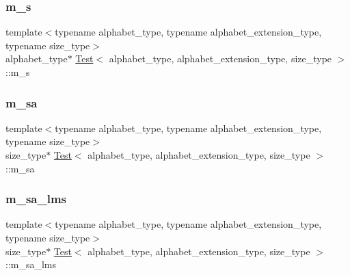 \mbox{\label{class_test_a2992148c8dda566ae4f4ebbdb26bdccd}} 
\subsubsection{\texorpdfstring{m\+\_\+s}{m\_s}}
{\footnotesize\ttfamily template$<$typename alphabet\+\_\+type, typename alphabet\+\_\+extension\+\_\+type, typename size\+\_\+type$>$ \\
alphabet\+\_\+type$\ast$ \hyperlink{class_test}{Test}$<$ alphabet\+\_\+type, alphabet\+\_\+extension\+\_\+type, size\+\_\+type $>$\+::m\+\_\+s\hspace{0.3cm}{\ttfamily [private]}}

\mbox{\label{class_test_a38956729bdb63c0bfe7760e827769309}} 
\subsubsection{\texorpdfstring{m\+\_\+sa}{m\_sa}}
{\footnotesize\ttfamily template$<$typename alphabet\+\_\+type, typename alphabet\+\_\+extension\+\_\+type, typename size\+\_\+type$>$ \\
size\+\_\+type$\ast$ \hyperlink{class_test}{Test}$<$ alphabet\+\_\+type, alphabet\+\_\+extension\+\_\+type, size\+\_\+type $>$\+::m\+\_\+sa\hspace{0.3cm}{\ttfamily [private]}}

\mbox{\label{class_test_a557862839f4ead2e08d12e7770340ded}} 
\subsubsection{\texorpdfstring{m\+\_\+sa\+\_\+lms}{m\_sa\_lms}}
{\footnotesize\ttfamily template$<$typename alphabet\+\_\+type, typename alphabet\+\_\+extension\+\_\+type, typename size\+\_\+type$>$ \\
size\+\_\+type$\ast$ \hyperlink{class_test}{Test}$<$ alphabet\+\_\+type, alphabet\+\_\+extension\+\_\+type, size\+\_\+type $>$\+::m\+\_\+sa\+\_\+lms\hspace{0.3cm}{\ttfamily [private]}}

